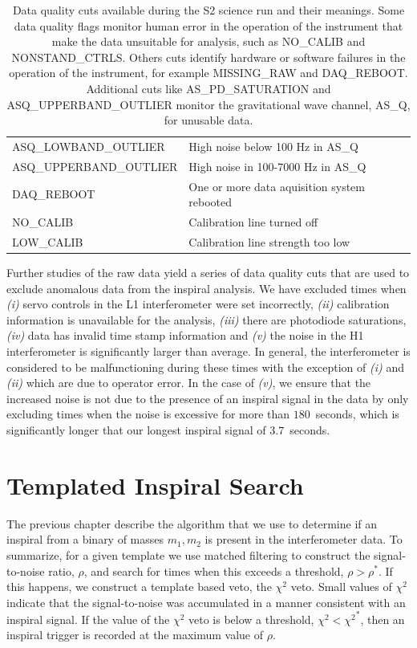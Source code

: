 \begin{table}
\begin{center}
\begin{tabular}{ll}
ASQ\_LOWBAND\_OUTLIER     & High noise below 100 Hz in AS\_Q \\
ASQ\_UPPERBAND\_OUTLIER   & High noise in 100-7000 Hz in AS\_Q \\
DAQ\_REBOOT               & One or more data aquisition system rebooted \\
NO\_CALIB                 & Calibration line turned off \\
LOW\_CALIB                & Calibration line strength too low
\end{tabular}
\end{center}
\caption{\label{t:dqflags}%
Data quality cuts available during the S2 science run and their meanings. 
Some data quality flags monitor human error in the operation of the
instrument that make the data unsuitable for analysis, such as NO\_CALIB and
NONSTAND\_CTRLS. Others cuts identify hardware or software failures in the
operation of the instrument, for example MISSING\_RAW and DAQ\_REBOOT.
Additional cuts like AS\_PD\_SATURATION and ASQ\_UPPERBAND\_OUTLIER monitor
the gravitational wave channel, AS\_Q, for unusable data.
}
\end{table}

Further studies of the raw data yield a series of data quality cuts
that are used to exclude anomalous data from the inspiral
analysis\cite{gwdawveto}. We have excluded times when \emph{(i)} servo
controls in the L1 interferometer were set incorrectly, \emph{(ii)}
calibration information is unavailable for the analysis, \emph{(iii)} there
are photodiode saturations, \emph{(iv)} data has invalid time stamp
information and \emph{(v)} the noise in the H1 interferometer is significantly
larger than average. In general, the interferometer is considered to be
malfunctioning during these times with the exception of \emph{(i)} and
\emph{(ii)} which are due to operator error. In the case of \emph{(v)}, we
ensure that the increased noise is not due to the presence of an inspiral
signal in the data by only excluding times when the noise is excessive for
more than $180$~seconds, which is significantly longer that our longest inspiral
signal of $3.7$~seconds.

\section{Templated Inspiral Search}
\label{s:pipetemplate}

The previous chapter describe the algorithm that we use to determine if an
inspiral from a binary of masses ${m_1,m_2}$ is present in the interferometer
data. To summarize, for a given template we use matched filtering to construct
the signal-to-noise ratio, $\rho$, and search for times when this exceeds a
threshold, $\rho > \rho^\ast$. If this happens, we construct a template based
veto, the $\chi^2$ veto\cite{brucechisq}. Small values of $\chi^2$ indicate
that the signal-to-noise was accumulated in a manner consistent with an
inspiral signal. If the value of the $\chi^2$ veto is below a threshold,
$\chi^2 < {\chi^2}^\ast$, then an inspiral trigger is recorded at the maximum
value of $\rho$.

